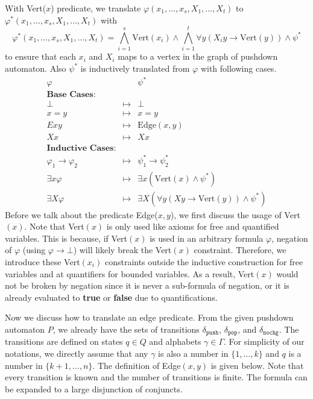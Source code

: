 \documentclass[10pt]{homework}
\begin{document}
With Vert(\(x\)) predicate, we translate \(\varphi(x_1,\dots,x_s,X_1,\dots,X_t)\) to 
\(\varphi^*(x_1,\dots,x_s,X_1,\dots,X_t)\) with
\[
  \varphi^*(x_1,\dots,x_s,X_1,\dots,X_t) = 
     \bigwedge_{i=1}^s \text{Vert}(x_i) \land \bigwedge_{i=1}^t \forall y(X_i y \to \text{Vert}(y)) \land \psi^*
\]
to ensure that each \(x_i\) and \(X_i\) maps to a vertex in the graph of pushdown automaton.
Also \(\psi^*\) is inductively translated from \(\varphi\) with following cases.
\[
\begin{array}{lcl}
	\varphi                   &         & \psi^*                                                     \\
	\textbf{Base Cases:}      &  \\
	\bot                      & \mapsto & \bot                                                       \\
	x = y                     & \mapsto & x = y                                                      \\
	E x y                     & \mapsto & \text{Edge}(x, y)                                          \\
	X x                       & \mapsto & X x                                                        \\
	\textbf{Inductive Cases:} &  \\
	\varphi_1 \to \varphi_2   & \mapsto & \psi^*_1 \to \psi^*_2                                      \\
	\exists x \varphi         & \mapsto & \exists x(\text{Vert}(x) \land \psi^*)                     \\
	\exists X \varphi         & \mapsto & \exists X (\forall y(X y \to \text{Vert}(y)) \land \psi^*)
\end{array}
\]
Before we talk about the predicate Edge(\(x, y\)), we first discuss the usage of Vert\((x)\).
Note that Vert\((x)\) is only used like axioms for free and quantified variables.
This is because, if Vert\((x)\) is used in an arbitrary formula \(\varphi\),
negation of \(\varphi\) (using \(\varphi \to \bot\)) will likely break the Vert\((x)\) constraint.
Therefore, we introduce these Vert\((x_i)\) constraints outside the inductive construction
for free variables and at quantifiers for bounded variables.
As a result, Vert\((x)\) would not be broken by negation since it is never a sub-formula of negation,
or it is already evaluated to \textbf{true} or \textbf{false} due to quantifications.

Now we discuss how to translate an edge predicate.
From the given pushdown automaton \(P\), we already have the sets of transitions
\(\delta_\mathtt{push}\), \(\delta_\mathtt{pop}\), and \(\delta_\mathtt{nochg}\).
The transitions are defined on states \(q \in Q\) and alphabets \(\gamma \in \Gamma\).
For simplicity of our notations, we directly assume that any \(\gamma\) is also
a number in \(\{1,\dots, k\}\) and \(q\) is a number in \(\{k+1,\dots, n\}\).
The definition of Edge\((x, y)\) is given below.
Note that every transition is known and the number of transitions is finite.
The formula can be expanded to a large disjunction of conjuncts.
\end{document}
